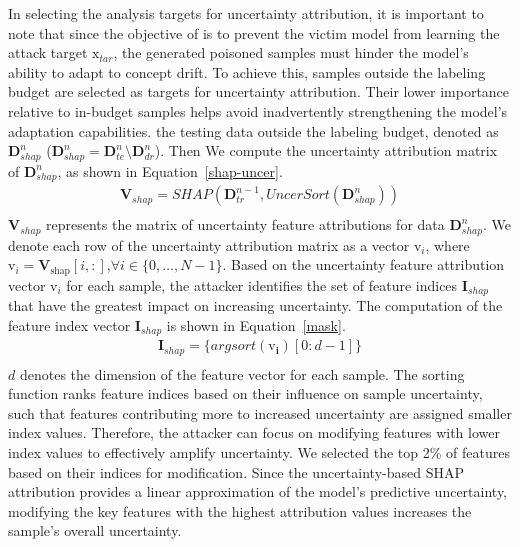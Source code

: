 In selecting the analysis targets for uncertainty attribution, it is important to note that since the objective of \pandora is to prevent the victim model from learning the attack target  $\bm{\mathrm{x}}_{tar}$, the generated poisoned samples must hinder the model’s ability to adapt to concept drift.
To achieve this, samples outside the labeling budget are selected as targets for uncertainty attribution.
Their lower importance relative to in-budget samples helps avoid inadvertently strengthening the model’s adaptation capabilities.
the testing data outside the labeling budget, denoted as $\bm{D}_{shap}^{n}$ ($\bm{D}_{shap}^{n} = \bm{D}_{te}^{n} \setminus \bm{D}_{dr}^{n}$).
Then We compute the uncertainty attribution matrix of $\bm{D}_{shap}^{n}$, as shown in Equation~\ref{shap-uncer}.
\begin{equation}
	\begin{aligned}
		\bm{V}_{shap} = SHAP (\bm{D}_{tr}^{n-1},UncerSort(\bm{D}_{shap}^{n})) \\
	\end{aligned}
	\label{shap-uncer}
\end{equation}
$\bm{V}_{shap}$ represents the matrix of uncertainty feature attributions for data $\bm{D}_{shap}^{n}$.
We denote each row of the uncertainty attribution matrix as a vector $\bm{\mathrm{v}}_{i}$, where $\bm{\mathrm{v}}_{i} =\bm{V}_{\text{shap}}[i,:]$,$\forall i \in \{0, \dots, N-1 \}$.
Based on the uncertainty feature attribution vector $\bm{\mathrm{v}}_{i}$ for each sample, the attacker identifies the set of feature indices $\bm{I}_{shap}$ that have the greatest impact on increasing uncertainty.
The computation of the feature index vector $\bm{I}_{shap}$ is shown in Equation~\ref{mask}.
\begin{equation}
	\begin{aligned}
		\bm{I}_{shap} = \{ argsort(\bm{\mathrm{v}_{i}})[0:d-1]  \} \\
		\end{aligned}
	\label{mask}
\end{equation}
$d$ denotes the dimension of the feature vector for each sample.
The sorting function ranks feature indices based on their influence on sample uncertainty, such that features contributing more to increased uncertainty are assigned smaller index values.  
Therefore, the attacker can focus on modifying features with lower index values to effectively amplify uncertainty.
We selected the top 2\% of features based on their indices for modification.
Since the uncertainty-based SHAP attribution provides a linear approximation of the model's predictive uncertainty, modifying the key features with the highest attribution values increases the sample's overall uncertainty.


